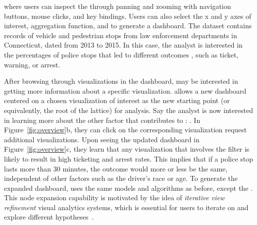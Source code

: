 where users can inspect the 
through panning and zooming with navigation buttons,
mouse clicks, and key bindings.
Users can also select the x and y axes of interest,
aggregation function, and 
to generate a dashboard.
The dataset contains records of vehicle and pedestrian stops from law enforcement departments in Connecticut, dated from 2013 to 2015. In this case, the analyst is interested in the percentages of police stops  that led to different outcomes , such as ticket, warning, or arrest.

After browsing through visualizations in the dashboard,
 may be interested in getting more information
about a specific visualization.
\system allows  
a new dashboard centered on a chosen visualization
of interest as the new starting point
(or equivalently, the root of the lattice)
for analysis.
Say the analyst is now interested in learning more
about the other factor that contributes to :
.
In Figure~\ref{fig:overview}b, they 
can click on the corresponding visualization
 request additional visualizations.
Upon seeing the updated dashboard in Figure~\ref{fig:overview}c,
they learn that any visualization
that involves the 
filter is likely to result in high ticketing and arrest rates.
This implies that if a police stop lasts more than 30 minutes,
the outcome would more or less be the same,
independent of other factors such as the driver's race or age.
To generate the expanded dashboard, \system uses the same models
and algorithms as before,
except the .
This node expansion capability is motivated
by the idea of \textit{iterative view refinement}
 visual analytics systems,
which is essential for users to iterate on and
explore different hypotheses~\cite{Hoque2017,Wongsuphasawat2016}.

